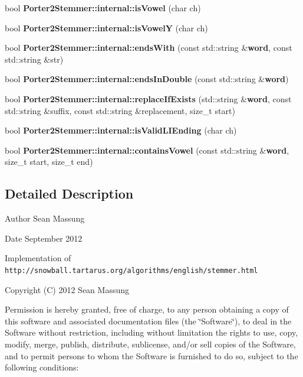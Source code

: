\begin{DoxyCompactItemize}
\item 
bool {\bfseries Porter2\+Stemmer\+::internal\+::is\+Vowel} (char ch)\label{porter2__stemmer_8h_a63d428e12b7b2aeea945c24afe44d1d2}

\item 
bool {\bfseries Porter2\+Stemmer\+::internal\+::is\+VowelY} (char ch)\label{porter2__stemmer_8h_a72ec1ef1732191be64f203bbe0e4397d}

\item 
bool {\bfseries Porter2\+Stemmer\+::internal\+::ends\+With} (const std\+::string \&{\bf word}, const std\+::string \&str)\label{porter2__stemmer_8h_a08785aaf007de16789d1cbc50a6d72b4}

\item 
bool {\bfseries Porter2\+Stemmer\+::internal\+::ends\+In\+Double} (const std\+::string \&{\bf word})\label{porter2__stemmer_8h_aca68167dfec7979b35d5bc732d2c6ef0}

\item 
bool {\bfseries Porter2\+Stemmer\+::internal\+::replace\+If\+Exists} (std\+::string \&{\bf word}, const std\+::string \&suffix, const std\+::string \&replacement, size\+\_\+t start)\label{porter2__stemmer_8h_aff7926ca225a004069d681b88826a73a}

\item 
bool {\bfseries Porter2\+Stemmer\+::internal\+::is\+Valid\+L\+I\+Ending} (char ch)\label{porter2__stemmer_8h_acb88f8cc716be69a9c19818473614d68}

\item 
bool {\bfseries Porter2\+Stemmer\+::internal\+::contains\+Vowel} (const std\+::string \&{\bf word}, size\+\_\+t start, size\+\_\+t end)\label{porter2__stemmer_8h_ade420031f6e4e4a9f432c82b7f54420b}

\end{DoxyCompactItemize}


\subsection{Detailed Description}
\begin{DoxyAuthor}{Author}
Sean Massung 
\end{DoxyAuthor}
\begin{DoxyDate}{Date}
September 2012
\end{DoxyDate}
Implementation of {\tt http\+://snowball.\+tartarus.\+org/algorithms/english/stemmer.\+html}

Copyright (C) 2012 Sean Massung

Permission is hereby granted, free of charge, to any person obtaining a copy of this software and associated documentation files (the \char`\"{}\+Software\char`\"{}), to deal in the Software without restriction, including without limitation the rights to use, copy, modify, merge, publish, distribute, sublicense, and/or sell copies of the Software, and to permit persons to whom the Software is furnished to do so, subject to the following conditions\+:

